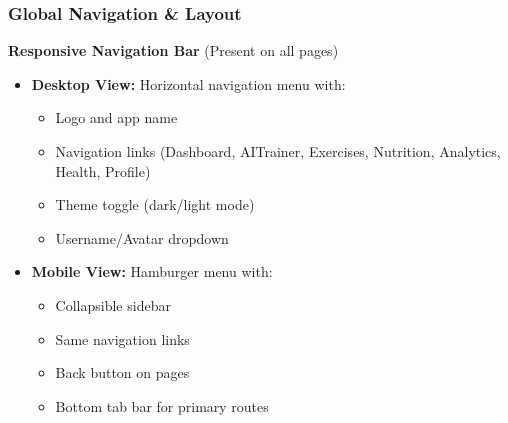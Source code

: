 \documentclass[12pt,a4paper]{article}
\begin{document}
\vspace{0.5cm}
\noindent{}
\vspace{1cm}


\subsubsection*{Global Navigation & Layout}

\textbf{Responsive Navigation Bar} (Present on all pages)

\begin{itemize}[noitemsep, topsep=2pt]
  \item \textbf{Desktop View:} Horizontal navigation menu with:
    \begin{itemize}[noitemsep, topsep=0pt]
      \item Logo and app name
      \item Navigation links (Dashboard, AITrainer, Exercises, Nutrition, Analytics, Health, Profile)
      \item Theme toggle (dark/light mode)
      \item Username/Avatar dropdown
    \end{itemize}
  
  \item \textbf{Mobile View:} Hamburger menu with:
    \begin{itemize}[noitemsep, topsep=0pt]
      \item Collapsible sidebar
      \item Same navigation links
      \item Back button on pages
      \item Bottom tab bar for primary routes
    \end{itemize}
\end{itemize}

\vspace{0.5cm}
\noindent{}
\vspace{1cm}
\end{document}
